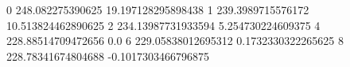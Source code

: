 0 248.082275390625 19.197128295898438
1 239.3989715576172 10.513824462890625
2 234.13987731933594 5.254730224609375
4 228.88514709472656 0.0
6 229.05838012695312 0.1732330322265625
8 228.78341674804688 -0.1017303466796875

